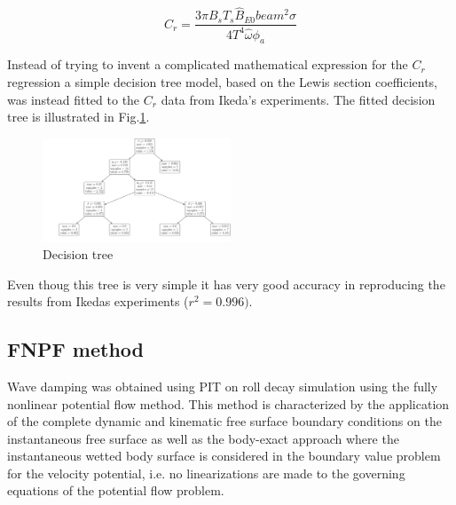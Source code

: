             
    
    \begin{equation}
C_{r} = \frac{3 \pi B_{s} T_{s} \hat{B}_{E0} beam^{2} \sigma}{4 T^{4} \hat{\omega} \phi_{a}}
\label{eq:C_r_2}
\end{equation}

\quad     

\quad     Instead of trying to invent a complicated mathematical expression for
the $C_r$ regression a simple decision tree model, based on the Lewis
section coefficients, was instead fitted to the $C_r$ data from
Ikeda's experiments. The fitted decision tree is illustrated in
Fig.\ref{fig:decision_tree}.

\quad     

\quad     \begin{figure}[H]
        \begin{center}\includegraphics[width = 0.5\textwidth]{figures/decision_tree.pdf}\end{center}
        \vspace{-1cm}
        \caption{Decision tree}
        \label{fig:decision_tree}
    \end{figure}
    
    Even thoug this tree is very simple it has very good accuracy in
reproducing the results from Ikedas experiments ($r^2=0.996)$.

\quad     \subsection*{FNPF method}\label{fnpf-method}

\quad \label{fnpf-method} Wave damping was obtained using PIT on roll decay
simulation using the fully nonlinear potential flow method. This method
is characterized by the application of the complete dynamic and
kinematic free surface boundary conditions on the instantaneous free
surface as well as the body-exact approach where the instantaneous
wetted body surface is considered in the boundary value problem for the
velocity potential, i.e. no linearizations are made to the governing
equations of the potential flow problem.


